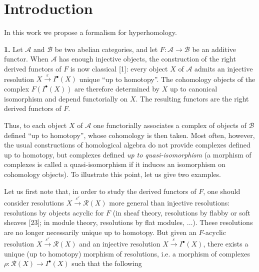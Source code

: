 \chapter*{Introduction}

In this work we propose a formalism for hyperhomology.

\noindent\textbf{1.}\quad
Let $\mathcal A$ and $\mathcal B$ be two abelian categories, and let
$F:\mathcal A\to\mathcal B$ be an additive functor. When $\mathcal A$ has
enough injective objects, the construction of the right derived functors of
$F$ is now classical [1]: every object $X$ of $\mathcal A$ admits an injective
resolution $X\xrightarrow{\varepsilon}I^{\bullet}(X)$ unique ``up to
homotopy''. The cohomology objects of the complex $F(I^{\bullet}(X))$ are
therefore determined by $X$ up to canonical isomorphism and depend
functorially on $X$. The resulting functors are the right derived functors of
$F$.

Thus, to each object $X$ of $\mathcal A$ one functorially associates a complex
of objects of $\mathcal B$ defined ``up to homotopy'', whose cohomology is then
taken. Most often, however, the usual constructions of homological algebra do
not provide complexes defined up to homotopy, but complexes defined
\emph{up to quasi-isomorphism} (a morphism of complexes is called a
quasi-isomorphism if it induces an isomorphism on cohomology objects). To
illustrate this point, let us give two examples.

Let us first note that, in order to study the derived functors of $F$, one
should consider resolutions $X\xrightarrow{\varepsilon'}\mathcal R(X)$ more
general than injective resolutions: resolutions by objects acyclic for $F$
(in sheaf theory, resolutions by flabby or soft sheaves [23]; in module
theory, resolutions by flat modules, $\ldots$). These resolutions are no
longer necessarily unique up to homotopy. But given an $F$-acyclic resolution
$X\xrightarrow{\varepsilon'}\mathcal R(X)$ and an injective resolution
$X\xrightarrow{\varepsilon}I^{\bullet}(X)$, there exists a unique (up to
homotopy) morphism of resolutions, i.e. a morphism of complexes
$\rho:\mathcal R(X)\to I^{\bullet}(X)$ such that the following\ %
